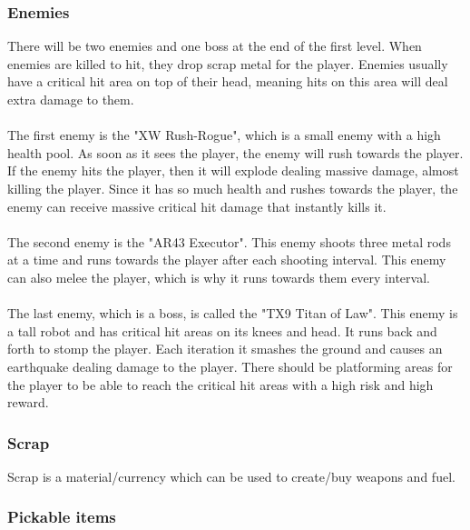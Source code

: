 \documentclass[../Main.tex]{subfiles}
\begin{document}
\subsubsection{Enemies}

 There will be two enemies and one boss at the end of the first level. When enemies are killed to hit, they drop scrap metal for the player. Enemies usually have a critical hit area on top of their head, meaning hits on this area will deal extra damage to them. 

\paragraph{}
The first enemy is the "XW Rush-Rogue", which is a small enemy with a high health pool. As soon as it sees the player, the enemy will rush towards the player. If the enemy hits the player, then it will explode dealing massive damage, almost killing the player. Since it has so much health and rushes towards the player, the enemy can receive massive critical hit damage that instantly kills it.

\paragraph{}
The second enemy is the "AR43 Executor". This enemy shoots three metal rods at a time and runs towards the player after each shooting interval. This enemy can also melee the player, which is why it runs towards them every interval.

\paragraph{}
The last enemy, which is a boss, is called the "TX9 Titan of Law". This enemy is a tall robot and has critical hit areas on its knees and head. It runs back and forth to stomp the player. Each iteration it smashes the ground and causes an earthquake dealing damage to the player. There should be platforming areas for the player to be able to reach the critical hit areas with a high risk and high reward. 

\subsubsection{Scrap}

Scrap is a material/currency which can be used to create/buy weapons and fuel. 

\subsubsection{Pickable items}
\end{document}
